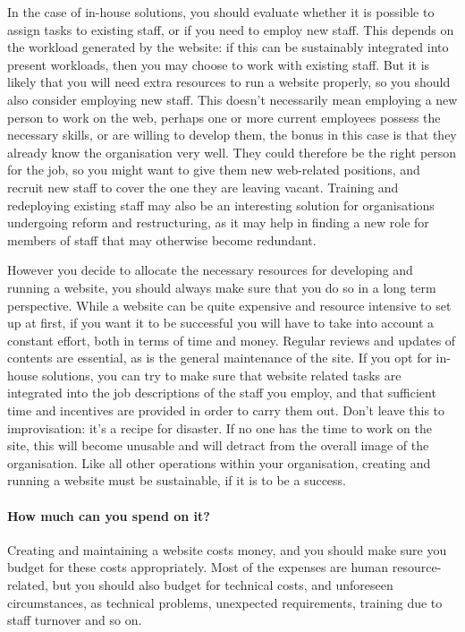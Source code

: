 In the case of in-house solutions, you should evaluate whether it is possible to assign tasks to existing staff, or if you need to employ new staff. This depends on the workload generated by the website: if this can be sustainably integrated into present workloads, then you may choose to work with existing staff. But it is likely that you will need extra resources to run a website properly, so you should also consider employing new staff. This doesn't necessarily mean employing a new person to work on the web, perhaps one or more current employees possess the necessary skills, or are willing to develop them, the bonus in this case is that they already know the organisation very well. They could therefore be the right person for the job, so you might want to give them new web-related positions, and recruit new staff to cover the one they are leaving vacant. Training and redeploying existing staff may also be an interesting solution for organisations undergoing reform and restructuring, as it may help in finding a new role for members of staff that may otherwise become redundant.

However you decide to allocate the necessary resources for developing and running a website, you should always make sure that you do so in a long term perspective. While a website can be quite expensive and resource intensive to set up at first, if you want it to be successful you will have to take into account a constant effort, both in terms of time and money. Regular reviews and updates of contents are essential, as is the general maintenance of the site. If you opt for in-house solutions, you can try to make sure that website related tasks are integrated into the job descriptions of the staff you employ, and that sufficient time and incentives are provided in order to carry them out. Don't leave this to improvisation: it's a recipe for disaster. If no one has the time to work on the site, this will become unusable and will detract from the overall image of the organisation. Like all other operations within your organisation, creating and running a website must be sustainable, if it is to be a success.

\paragraph{How much can you spend on it?}

Creating and maintaining a website costs money, and you should make sure you budget for these costs appropriately. Most of the expenses are human resource-related, but you should also budget for technical costs, and unforeseen circumstances, as technical problems, unexpected requirements, training due to staff turnover and so on.

